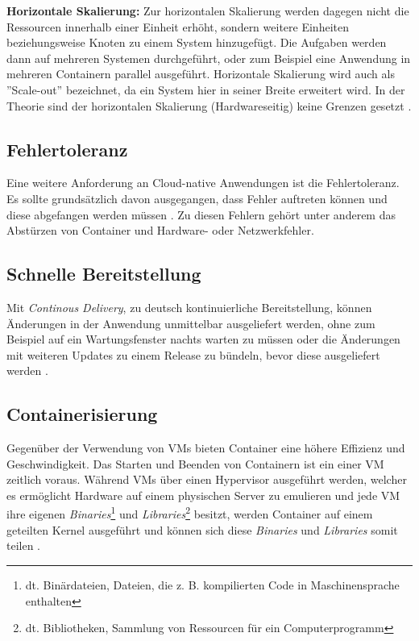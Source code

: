 \textbf{Horizontale Skalierung:}
Zur horizontalen Skalierung werden dagegen nicht die Ressourcen innerhalb einer Einheit erhöht, sondern weitere Einheiten beziehungsweise Knoten zu einem System hinzugefügt. Die Aufgaben werden dann auf mehreren Systemen durchgeführt, oder zum Beispiel eine Anwendung in mehreren Containern parallel ausgeführt. Horizontale Skalierung wird auch als ''Scale-out'' bezeichnet, da ein System hier in seiner Breite erweitert wird. In der Theorie sind der horizontalen Skalierung (Hardwareseitig) keine Grenzen gesetzt \cite[Vgl.][]{Geißler2019}\cite[Vgl.][]{VMware}.

\subsection{Fehlertoleranz}
Eine weitere Anforderung an Cloud-native Anwendungen ist die Fehlertoleranz. Es sollte grundsätzlich davon ausgegangen, dass Fehler auftreten können und diese abgefangen werden müssen \cite[Vgl.][S. 17]{Gannon2017}. Zu diesen Fehlern gehört unter anderem das Abstürzen von Container und Hardware- oder Netzwerkfehler.

\subsection{Schnelle Bereitstellung}
Mit \textit{Continous Delivery}, zu deutsch kontinuierliche Bereitstellung, können Änderungen in der Anwendung unmittelbar ausgeliefert werden, ohne zum Beispiel auf ein Wartungsfenster nachts warten zu müssen oder die Änderungen mit weiteren Updates zu einem Release zu bündeln, bevor diese ausgeliefert werden \cite[Vgl.][]{VMwareb}. \pagebreak

\subsection{Containerisierung}
Gegenüber der Verwendung von \acp{VM} bieten Container eine höhere Effizienz und Geschwindigkeit. Das Starten und Beenden von Containern ist ein einer \ac{VM} zeitlich voraus. \cite[Vgl.][]{VMwareb}
Während \acp{VM} über einen Hypervisor ausgeführt werden, welcher es ermöglicht Hardware auf einem physischen Server zu emulieren und jede \ac{VM} ihre eigenen \textit{Binaries}\footnote{dt. Binärdateien, Dateien, die z. B. kompilierten Code in Maschinensprache enthalten} und \textit{Libraries}\footnote{dt. Bibliotheken, Sammlung von Ressourcen für ein Computerprogramm} besitzt, werden Container auf einem geteilten Kernel ausgeführt und können sich diese \textit{Binaries} und \textit{Libraries} somit teilen \cite[Vgl.][]{Jones2018}.

